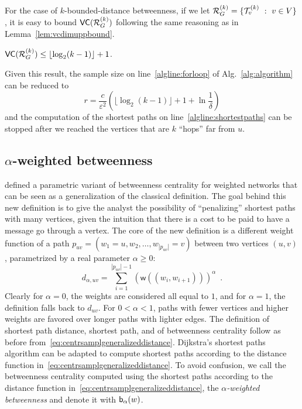 For the case of $k$-bounded-distance betweenness, if we let
$\mathcal{R}_G^{(k)}=\{\mathcal{T}_v^{(k)}~:~ v\in V\}$, it is easy to bound
$\mathsf{VC}(\mathcal{R}_G^{(k)})$ following the same reasoning as in
Lemma~\ref{lem:vcdimuppbound}.
\begin{lemma}\label{lem:vcdimuppboundk}
$\mathsf{VC}(\mathcal{R}_G^{(k)})\le\lfloor\log_2(k-1)\rfloor+1$.
\end{lemma}

Given this result, the sample size on line~\ref{algline:forloop}
of Alg.~\ref{alg:algorithm} can be reduced to 
\[ 
  r= \frac{c}{\varepsilon^2}\left(\lfloor\log_2(k-1)\rfloor + 1 +\ln\frac{1}{\delta}\right)
\]
and the computation of the shortest paths on line~\ref{algline:shortestpaths}
can be stopped after we reached the vertices that are $k$ ``hops'' far from $u$.

\subsection{$\alpha$-weighted betweenness}
\citet{OpsahlAS10} defined a parametric variant of betweenness centrality for
weighted networks that can be seen as a generalization of the classical 
definition. The goal behind this new definition is to give the analyst the
possibility of ``penalizing'' shortest paths with many vertices, given the
intuition that there is a cost to be paid to have a message go through a vertex.
The core of the new definition is a different weight function of a path
$p_{uv}=(w_1=u,w_2,\dotsc,w_{|p_{uv}|}=v)$ between two vertices $(u,v)$,
parametrized by a real parameter $\alpha\ge 0$:
\begin{equation}\label{eq:centrsamplgeneralizeddistance}
d_{\alpha,uv}=\sum_{i=1}^{|p_{uv}|-1}(\mathsf{w}((w_i,w_{i+1})))^\alpha\enspace. 
\end{equation}
Clearly for $\alpha=0$, the weights are considered all equal to $1$, and for
$\alpha=1$, the definition falls back to $d_{uv}$. For $0<\alpha<1$, paths with
fewer vertices and higher weights are favored over longer paths with lighter
edges\citep{OpsahlAS10}. The definition of shortest path distance, shortest
path, and of betweenness centrality follow as before
from~\eqref{eq:centrsamplgeneralizeddistance}. Dijkstra's shortest paths algorithm can be
adapted to compute shortest paths according to the distance function
in~\eqref{eq:centrsamplgeneralizeddistance}. To avoid confusion, we call the betweenness
centrality computed using the shortest paths according to the distance function
in~\eqref{eq:centrsamplgeneralizeddistance}, the \emph{$\alpha$-weighted betweenness} and
denote it with $\mathsf{b}_\alpha(w)$. 

